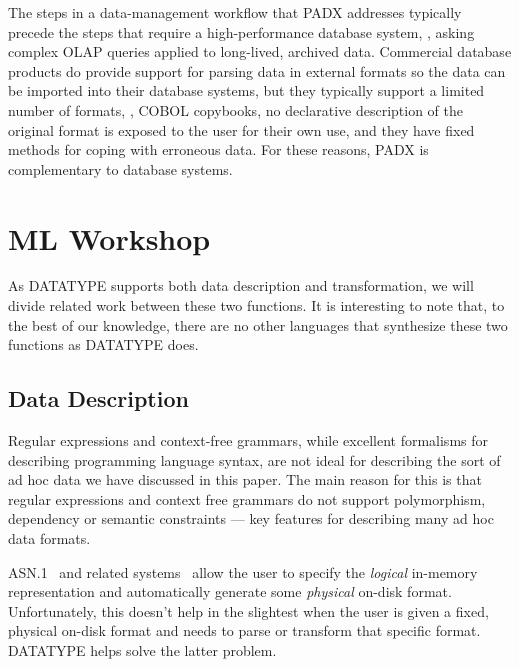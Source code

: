 
The steps in a data-management workflow that PADX{} addresses
typically precede the steps that require a high-performance database
system, \eg{}, asking complex OLAP queries applied to long-lived,
archived data.  Commercial database products do provide support for
parsing data in external formats so the data can be imported into
their database systems, but they typically support a limited number of
formats, \eg{}, COBOL copybooks, no declarative description of the
original format is exposed to the user for their own use, and they
have fixed methods for coping with erroneous data.  For these reasons,
PADX{} is complementary to database systems.

\section{ML Workshop}

As DATATYPE{} supports both data description and transformation, we
will divide related work between these two functions. It is
interesting to note that, to the best of our knowledge, there are no
other languages that synthesize these two functions as DATATYPE{}
does.

\subsection{Data Description}
Regular
expressions and context-free grammars, while excellent formalisms for
describing programming language syntax, are not ideal for describing
the sort of ad hoc data we have discussed in this paper.  The main
reason for this is that regular expressions and context free grammars
do not support polymorphism, dependency or semantic constraints ---
key features for describing many ad hoc data formats.

ASN.1~\cite{asn} and related systems~\cite{asdl} allow the user to
specify the {\em logical} in-memory representation and
automatically generate some 
{\em physical} on-disk format. 
Unfortunately, this doesn't help in the slightest when the user is
given a fixed, physical on-disk format and needs to parse or transform
that specific format.  DATATYPE{} helps solve
the latter problem.

